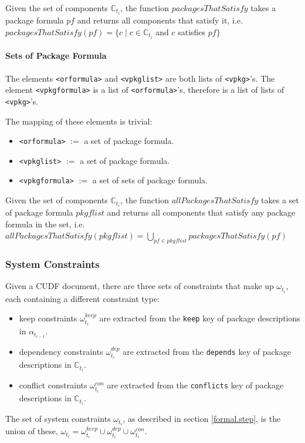\begin{defs}
Given the set of components $\mathbb{C}_{t_i}$,
the function $packagesThatSatisfy$ takes a package formula $pf$ and returns all components that satisfy it, i.e. $packagesThatSatisfy(pf) = \{c \mid c \in \mathbb{C}_{t_i}$ and $ c$ satisfies $pf\}$
\end{defs}

\paragraph{Sets of Package Formula}
The elements \texttt{<orformula>} and \texttt{<vpkglist>} are both lists of \texttt{<vpkg>}'s.
The element \texttt{<vpkgformula>} is a list of \texttt{<orformula>}'s, therefore is a list of lists of \texttt{<vpkg>}'s.

The mapping of these elements is trivial:
\begin{itemize}
  \item \texttt{<orformula>} $ := $ a set of package formula.
  \item \texttt{<vpkglist>} $ := $ a set of package formula.
  \item \texttt{<vpkgformula>} $ := $ a set of sets of package formula.
\end{itemize}

\begin{defs}
Given the set of components $\mathbb{C}_{t_i}$,
the function $allPackagesThatSatisfy$ takes a set of package formula $pkgflist$ and returns all components that satisfy any package formula in the set,
i.e. $allPackagesThatSatisfy(pkgflist) = \bigcup \limits_{pf \in pkgflist} packagesThatSatisfy(pf)$ 
\end{defs}

\subsubsection{System Constraints}
Given a CUDF document, there are three sets of constraints that make up $\omega_{t_i}$, each containing a different constraint type:
\begin{itemize}
  \item keep constraints $\omega_{t_i}^{keep}$ are extracted from the \verb+keep+ key of package descriptions in $\alpha_{t_{i-1}}$.
  \item dependency constraints $\omega_{t_i}^{dep}$ are extracted from the \verb+depends+ key of package descriptions in $\mathbb{C}_{t_i}$.
  \item conflict constraints $\omega_{t_i}^{con}$ are extracted from the \verb+conflicts+ key of package descriptions in $\mathbb{C}_{t_i}$.
\end{itemize}
The set of system constraints $\omega_{t_i}$, as described in section \ref{formal.step}, is the union of these,
$\omega_{t_i} =  \omega_{t_i}^{keep} \cup \omega_{t_i}^{dep} \cup \omega_{t_i}^{con}$.


